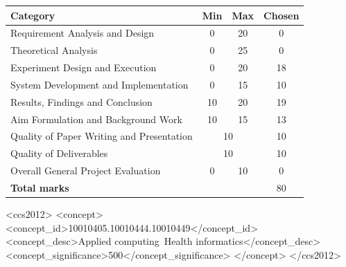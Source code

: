 \documentclass{sig-alternate-05-2015}
\begin{document}
	\renewcommand{\arraystretch}{1.25}
	\begin{tabular}{|l|c|c|c|}
		\hline
		\textbf{Category} & \textbf{Min} & \textbf{Max} & \textbf{Chosen} \\ \hline \hline
		Requirement Analysis and Design & 0 & 20 &
		0 \\ \hline
		Theoretical Analysis & 0 & 25 &
		0 \\ \hline
		Experiment Design and Execution & 0 & 20 &
		18 \\ \hline
		System Development and Implementation & 0 & 15 &
		10 \\ \hline
		Results, Findings and Conclusion & 10 & 20 &
		19 \\ \hline
		Aim Formulation and Background Work & 10 & 15 &
		13 \\ \hline
		Quality of Paper Writing and Presentation & \multicolumn{2}{c|}{10} &
		10 \\ \hline
		Quality of Deliverables & \multicolumn{2}{c|}{10} &
		10 \\ \hline
		Overall General Project Evaluation & 0 & 10 &
		0\\ \hline
		\hline
		\multicolumn{3}{|l|}{\textbf{Total marks}} & 80 \\ \hline
	\end{tabular}
	
	\endgroup
	\thispagestyle{empty}
	\newpage
	\setcounter{page}{1}
	
	
	
	\begin{CCSXML}
	 	<ccs2012>
	 	<concept>
	 	<concept_id>10010405.10010444.10010449</concept_id>
	 	<concept_desc>Applied computing~Health informatics</concept_desc>
	 	<concept_significance>500</concept_significance>
	 	</concept>
	 	</ccs2012>
	\end{CCSXML}

	
	
	
	
	
	
\end{document}
